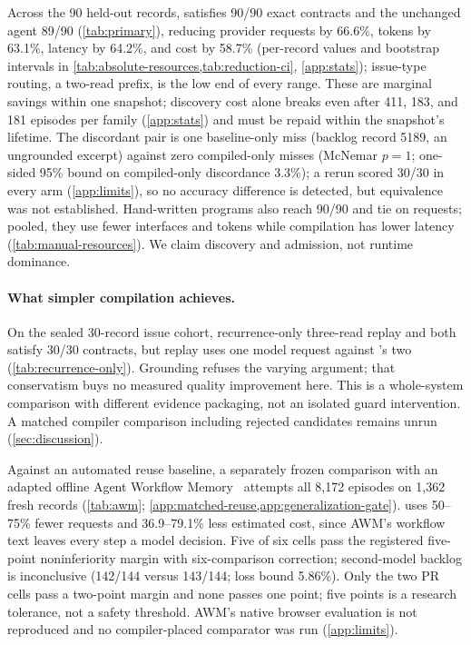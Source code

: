 Across the 90 held-out records, \method satisfies 90/90 exact contracts and the
unchanged agent 89/90 (\cref{tab:primary}), reducing provider requests by
66.6\%, tokens by 63.1\%, latency by 64.2\%, and cost by 58.7\% (per-record
values and bootstrap intervals in \cref{tab:absolute-resources,tab:reduction-ci},
\cref{app:stats}); issue-type routing, a two-read prefix, is the low end of
every range. These are marginal savings within one snapshot; discovery cost alone
breaks even after 411, 183, and 181 episodes per family (\cref{app:stats}) and
must be repaid within the snapshot's lifetime. The discordant pair is one
baseline-only miss (backlog record 5189, an ungrounded excerpt) against zero
compiled-only misses (McNemar $p=1$; one-sided 95\% bound on compiled-only
discordance 3.3\%); a rerun scored 30/30 in every arm (\cref{app:limits}), so no
accuracy difference is detected, but equivalence was not established.
Hand-written programs also reach 90/90 and tie on requests; pooled, they use
fewer interfaces and tokens while compilation has lower latency
(\cref{tab:manual-resources}). We claim discovery and admission, not runtime
dominance.

\paragraph{What simpler compilation achieves.}
On the sealed 30-record issue cohort, recurrence-only three-read replay and
\method both satisfy 30/30 contracts, but replay uses one model request
against \method's two (\cref{tab:recurrence-only}). Grounding refuses the
varying  argument; that conservatism buys no measured
quality improvement here. This is a whole-system comparison with different
evidence packaging, not an isolated guard intervention. A matched compiler
comparison including rejected candidates remains unrun (\cref{sec:discussion}).

Against an automated reuse baseline, a separately frozen comparison with an
adapted offline Agent Workflow Memory~\citep{wang2025awm} attempts all 8{,}172
episodes on 1{,}362 fresh records (\cref{tab:awm};
\cref{app:matched-reuse,app:generalization-gate}). \method uses 50--75\% fewer
requests and 36.9--79.1\% less estimated cost, since AWM's workflow text leaves
every step a model decision. Five of six cells pass the registered five-point
noninferiority margin with six-comparison correction; second-model backlog is
inconclusive (142/144 versus 143/144; loss bound 5.86\%). Only the two PR cells
pass a two-point margin and none passes one point; five points is a research
tolerance, not a safety threshold. AWM's native browser evaluation is not
reproduced and no compiler-placed comparator was run (\cref{app:limits}).

